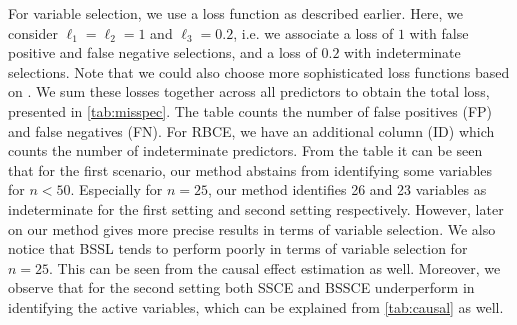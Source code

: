 \documentclass[preprint,12pt]{elsarticle}
\begin{document}
For variable selection, we use a loss function as described earlier.
Here, we consider
$\ell_1=\ell_2=1$ and $\ell_3= 0.2$,
i.e. we associate a loss of $1$ with false positive and false negative selections,
and a loss of $0.2$ with indeterminate selections.
Note that we could also choose more 
sophisticated loss functions based on \citep{ZAFFALON20121282}.
We sum these losses together across all predictors
to obtain the total loss, presented in \cref{tab:misspec}.
The table counts the number of
false positives (FP) and false negatives (FN). For RBCE, we have an
additional column (ID)
which counts the number of indeterminate predictors.
From the table it can be seen that for the first scenario, our method
abstains from identifying some variables for 
$n <50$. Especially for $n=25$, our method identifies 26 and 23 variables as indeterminate
for the first setting and second setting respectively. However,
later on our method gives more precise results in terms of variable
selection. We also notice that BSSL tends to perform poorly
in terms of variable selection for $n=25$. This can be seen
from the causal effect estimation as well.
Moreover, we observe that for the second setting both SSCE
and BSSCE underperform in identifying the active variables, which can 
be explained from \cref{tab:causal} as well. 
\end{document}
